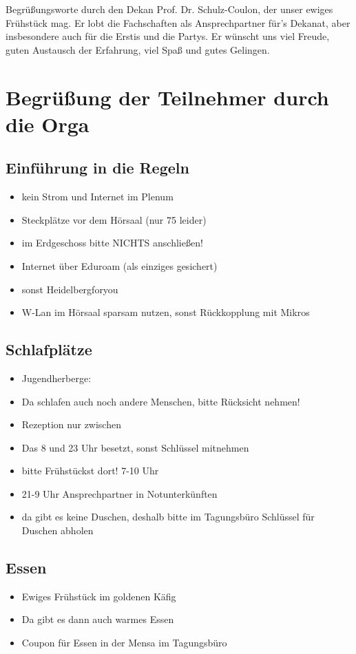
Begrüßungsworte durch den Dekan Prof. Dr. Schulz-Coulon, der unser ewiges Frühstück mag. Er lobt die Fachschaften als Ansprechpartner für's Dekanat, aber insbesondere auch für die Erstis und die Partys. Er wünscht uns viel Freude, guten Austausch der Erfahrung, viel Spaß und gutes Gelingen.

\section{Begrüßung der Teilnehmer durch die Orga}
  \subsection{Einführung in die Regeln}
    \begin{itemize}
      \item kein Strom und Internet im Plenum
      \item Steckplätze vor dem Hörsaal (nur 75 leider)
      \item im Erdgeschoss bitte NICHTS anschließen!
      \item Internet über Eduroam (als einziges gesichert)
      \item sonst Heidelbergforyou
      \item W-Lan im Hörsaal sparsam nutzen, sonst Rückkopplung mit Mikros
    \end{itemize}

  \subsection{Schlafplätze}
    \begin{itemize}
      \item Jugendherberge:
      \item Da schlafen auch noch andere Menschen, bitte Rücksicht nehmen!
      \item Rezeption nur zwischen
      \item Das  8 und 23 Uhr besetzt, sonst Schlüssel mitnehmen
      \item bitte Frühstückst dort! 7-10 Uhr
      \item 21-9 Uhr Ansprechpartner in Notunterkünften
      \item da gibt es keine Duschen, deshalb bitte im Tagungsbüro Schlüssel für Duschen abholen
    \end{itemize}

  \subsection{Essen}
    \begin{itemize}
      \item Ewiges Frühstück im goldenen Käfig
      \item Da gibt es dann auch warmes Essen
      \item Coupon für Essen in der Mensa im Tagungsbüro
    \end{itemize}

